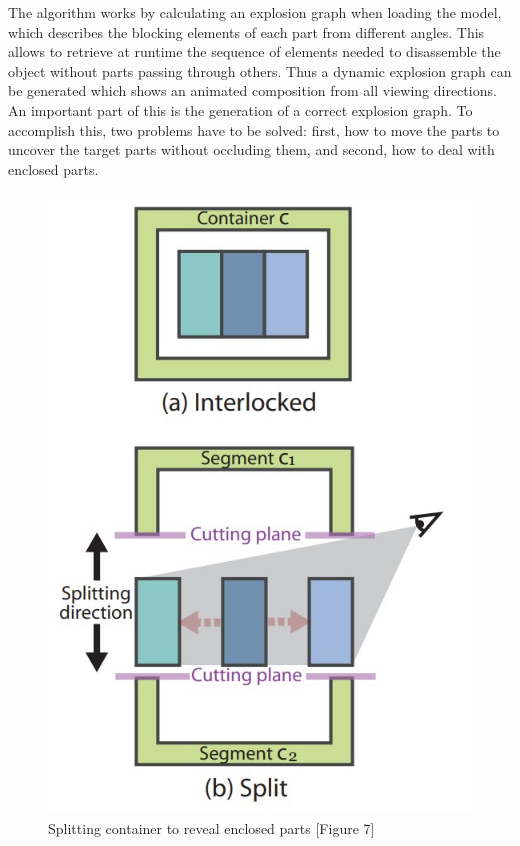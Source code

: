 The algorithm works by calculating an explosion graph when loading the model, which describes the blocking elements of each part from different angles. 
This allows to retrieve at runtime the sequence of elements needed to disassemble the object without parts passing through others. 
Thus a dynamic explosion graph can be generated which shows an animated composition from all viewing directions.
An important part of this is the generation of a correct explosion graph. 
To accomplish this, two problems have to be solved: first, how to move the parts to uncover the target parts without occluding them, and second, how to deal with enclosed parts. 
\begin{figure}
	\centering
	\vspace{-0.4cm}
	\includegraphics[width=1\linewidth]{fig/Images/AutomatedGenerationofInteractive3DExplodedViewDiagrams_Li2008_fig7}
	\caption[]{Splitting container to reveal enclosed parts \cite{Wilmot_Li_2008} [Figure 7]}
	\vspace{-0.8cm}
\end{figure}
